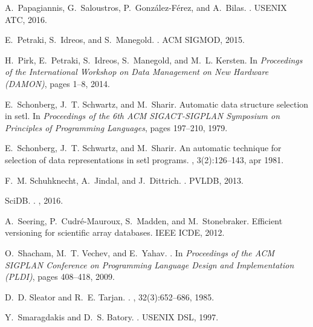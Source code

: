\documentclass[11pt]{article}
\begin{document}
\begin{thebibliography}{10}
\begin{small}
A.~Papagiannis, G.~Saloustros, P.~Gonz{\'{a}}lez-F{\'{e}}rez, and A.~Bilas.
.
\newblock USENIX ATC, 2016.

E.~Petraki, S.~Idreos, and S.~Manegold.
.
\newblock ACM SIGMOD, 2015.

H.~Pirk, E.~Petraki, S.~Idreos, S.~Manegold, and M.~L. Kersten.
\newblock In {\em Proceedings of the International Workshop on Data Management
  on New Hardware (DAMON)}, pages 1--8, 2014.

E.~Schonberg, J.~T. Schwartz, and M.~Sharir.
\newblock Automatic data structure selection in setl.
\newblock In {\em Proceedings of the 6th ACM SIGACT-SIGPLAN Symposium on
  Principles of Programming Languages}, pages 197--210, 1979.

E.~Schonberg, J.~T. Schwartz, and M.~Sharir.
\newblock An automatic technique for selection of data representations in setl
  programs.
, 3(2):126--143, apr 1981.

F.~M. Schuhknecht, A.~Jindal, and J.~Dittrich.
.
\newblock PVLDB, 2013.

SciDB.
.
, 2016.

A.~Seering, P.~Cudr{\'{e}}{-}Mauroux, S.~Madden, and M.~Stonebraker.
\newblock Efficient versioning for scientific array databases.
\newblock IEEE ICDE, 2012.

O.~Shacham, M.~T. Vechev, and E.~Yahav.
.
\newblock In {\em Proceedings of the ACM SIGPLAN Conference on Programming
  Language Design and Implementation (PLDI)}, pages 408--418, 2009.

D.~D. Sleator and R.~E. Tarjan.
.
, 32(3):652--686, 1985.

Y.~Smaragdakis and D.~S. Batory.
.
\newblock USENIX DSL, 1997.


\end{small}
\end{thebibliography}
\end{document}
